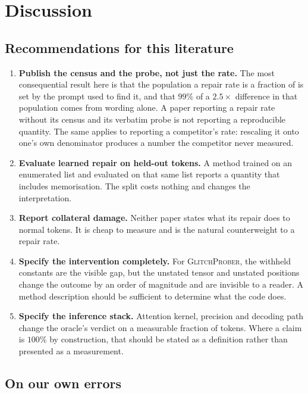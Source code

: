 \documentclass[11pt,a4paper]{article}
\newcommand{\gp}{\textsc{GlitchProber}}
\begin{document}
\section{Discussion}
\label{sec:discussion}

\subsection{Recommendations for this literature}

\begin{enumerate}[leftmargin=*]
\item \textbf{Publish the census and the probe, not just the rate.} The most
consequential result here is that the population a repair rate is a fraction of is
set by the prompt used to find it, and that $99\%$ of a $2.5\times$ difference in
that population comes from wording alone. A paper reporting a repair rate without
its census and its verbatim probe is not reporting a reproducible quantity. The
same applies to reporting a competitor's rate: rescaling it onto one's own
denominator produces a number the competitor never measured.
\item \textbf{Evaluate learned repair on held-out tokens.} A method trained on an
enumerated list and evaluated on that same list reports a quantity that includes
memorisation. The split costs nothing and changes the interpretation.
\item \textbf{Report collateral damage.} Neither paper states what its repair does
to normal tokens. It is cheap to measure and is the natural counterweight to a
repair rate.
\item \textbf{Specify the intervention completely.} For \gp{}, the withheld
constants are the visible gap, but the unstated tensor and unstated positions
change the outcome by an order of magnitude and are invisible to a reader. A
method description should be sufficient to determine what the code does.
\item \textbf{Specify the inference stack.} Attention kernel, precision and
decoding path change the oracle's verdict on a measurable fraction of tokens.
Where a claim is $100\%$ by construction, that should be stated as a definition
rather than presented as a measurement.
\end{enumerate}

\subsection{On our own errors}
\end{document}
